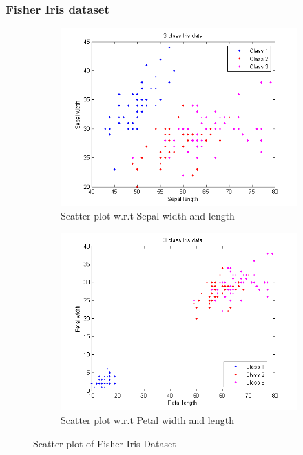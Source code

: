 \documentclass{beamer}
\begin{document}

\begin{frame}
\frametitle{Fisher Iris dataset}
\begin{figure}[H]
\begin{subfigure}{.5\textwidth}
  \centering
  \includegraphics[width=\linewidth]{iris_1}
\caption{Scatter plot w.r.t Sepal width and length} 
\end{subfigure}%
\begin{subfigure}{.5\textwidth}
  \centering
  \includegraphics[width=\linewidth]{iris_2}
\caption{Scatter plot w.r.t Petal width and length} 
\end{subfigure}
\caption{Scatter plot of Fisher Iris Dataset} 
\end{figure}
\end{frame}
\end{document}
